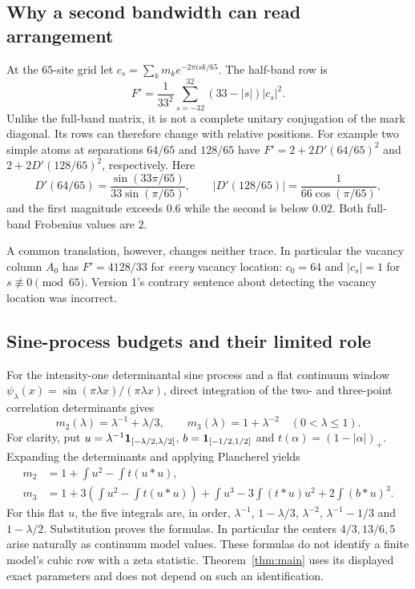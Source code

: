 \documentclass[11pt]{article}
\theoremstyle{definition}\newtheorem{definition}[theorem]{Definition}
\theoremstyle{remark}\newtheorem{remark}[theorem]{Remark}
\begin{document}
\subsection{Why a second bandwidth can read arrangement}
At the $65$-site grid let $c_s=\sum_km_k e^{-2\pi isk/65}$. The half-band row is
\[
 F'=\frac1{33^2}\sum_{s=-32}^{32}(33-|s|)|c_s|^2.
\]
Unlike the full-band matrix, it is not a complete unitary conjugation of the
mark diagonal. Its rows can therefore change with relative positions.
For example two simple atoms at separations $64/65$ and $128/65$ have
$F'=2+2D'(64/65)^2$ and $2+2D'(128/65)^2$, respectively. Here
\[
 D'(64/65)=\frac{\sin(33\pi/65)}{33\sin(\pi/65)},\qquad
 |D'(128/65)|=\frac1{66\cos(\pi/65)},
\]
and the first magnitude exceeds $0.6$ while the second is below $0.02$.
Both full-band Frobenius values are $2$.

A common translation, however, changes neither trace. In particular the
vacancy column $A_0$ has $F'=4128/33$ for \emph{every} vacancy location:
$c_0=64$ and $|c_s|=1$ for $s\not\equiv0\pmod{65}$. Version 1's contrary
sentence about detecting the vacancy location was incorrect.

\subsection{Sine-process budgets and their limited role}
For the intensity-one determinantal sine process and a flat continuum
window $\psi_\lambda(x)=\sin(\pi\lambda x)/(\pi\lambda x)$, direct integration
of the two- and three-point correlation determinants gives
\[
 m_2(\lambda)=\lambda^{-1}+\lambda/3,\qquad
 m_3(\lambda)=1+\lambda^{-2}\quad(0<\lambda\le1).
\]
For clarity, put $u=\lambda^{-1}\mathbf 1_{[-\lambda/2,\lambda/2]}$,
$b=\mathbf 1_{[-1/2,1/2]}$ and $t(\alpha)=(1-|\alpha|)_+$. Expanding the
determinants and applying Plancherel yields
\begin{align*}
 m_2&=1+\int u^2-\int t(u*u),\\
 m_3&=1+3\left(\int u^2-\int t(u*u)\right)
       +\int u^3-3\int(t*u)u^2+2\int(b*u)^3.
\end{align*}
For this flat $u$, the five integrals are, in order,
$\lambda^{-1}$, $1-\lambda/3$, $\lambda^{-2}$,
$\lambda^{-1}-1/3$ and $1-\lambda/2$. Substitution proves the formulas.
In particular the centers $4/3,13/6,5$ arise naturally as continuum model
values. These formulas do not identify a finite model's cubic row with a
zeta statistic. Theorem~\ref{thm:main} uses its displayed exact parameters
and does not depend on such an identification.
\end{document}
